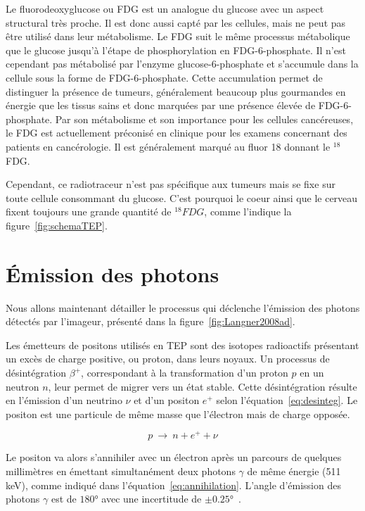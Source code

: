 Le fluorodeoxyglucose ou FDG est un analogue du glucose avec un aspect structural très proche. Il est donc aussi capté par les cellules, mais ne peut pas être utilisé dans leur métabolisme. Le FDG suit le même processus métabolique que le glucose jusqu’à l’étape de phosphorylation en FDG-6-phosphate. Il n’est cependant pas métabolisé par l’enzyme glucose-6-phosphate et s’accumule dans la cellule sous la forme de FDG-6-phosphate. Cette accumulation permet de distinguer la présence de tumeurs, généralement beaucoup plus gourmandes en énergie que les tissus sains et donc marquées par une présence élevée de FDG-6-phosphate. Par son métabolisme et son importance pour les cellules cancéreuses, le FDG est actuellement préconisé en clinique pour les examens concernant des patients en cancérologie. Il est généralement marqué au fluor 18 donnant le $^{18}$FDG.

Cependant, ce radiotraceur n'est pas spécifique aux tumeurs mais se fixe sur toute cellule consommant du glucose. C'est pourquoi le coeur ainsi que le cerveau fixent toujours une grande quantité de $^{18}FDG$, comme l'indique la figure~\ref{fig:schemaTEP}.

\section{\'Emission des photons}

Nous allons maintenant détailler le processus qui déclenche l'émission des photons détectés par l'imageur, présenté dans la figure~\ref{fig:Langner2008ad}.

Les émetteurs de positons utilisés en TEP sont des isotopes radioactifs présentant un excès de charge positive, ou proton, dans leurs noyaux. Un processus de désintégration $\beta^+$, correspondant à la transformation d’un proton $p$ en un neutron $n$, leur permet de migrer vers un état stable. Cette désintégration résulte en l’émission d’un neutrino $\nu$ et d’un positon $e^+$ selon l’équation~\ref{eq:desinteg}. Le positon est une particule de même masse que l’électron mais de charge opposée.

\begin{equation}
 p~\rightarrow~n + e^+ + \nu
\label{eq:desinteg}
\end{equation}

Le positon va alors s'annihiler avec un électron après un parcours de quelques millimètres en émettant simultanément deux photons $\gamma$ de même énergie (511 keV), comme indiqué dans l'équation~\ref{eq:annihilation}. L'angle d'émission des photons $\gamma$ est de $180°$ avec une incertitude de $\pm 0.25°$~\cite{bailey2005positon}.

